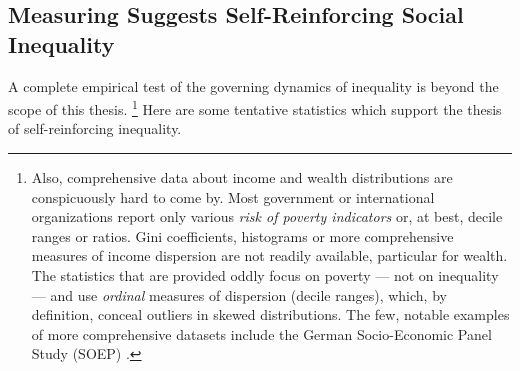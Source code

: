 


\subsection[Measures of Inequality]{Measuring Suggests Self-Reinforcing Social Inequality}
A complete empirical test of the governing dynamics of inequality is beyond the scope of this thesis.
\footnote{
	Also, comprehensive data about income and wealth distributions are conspicuously hard to come by.
	Most government or international organizations report only various \emph{risk of poverty indicators} or, at best, decile ranges or ratios.
	Gini coefficients, histograms or more comprehensive measures of income dispersion are not readily available, particular for wealth.
	The statistics that are provided oddly focus on poverty --- not on inequality --- and use \emph{ordinal} measures of dispersion (decile ranges), which, by definition, conceal outliers in skewed distributions.
	The few, notable examples of more comprehensive datasets include the German Socio-Economic Panel Study (SOEP) \citep{Wagner2007,Grabka2007}.
}
Here are some tentative statistics which support the thesis of self-reinforcing inequality.

